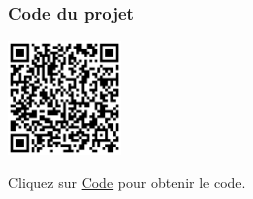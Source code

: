 \documentclass[a4paper,12pt]{report}
\begin{document}
\subsubsection{Code du projet}

\begin{minipage}{0.5\textwidth}
    \includegraphics[height=3cm]{Code TC206.png}
\end{minipage}%
\begin{minipage}{0.5\textwidth}
    Cliquez sur \href{https://github.com/DexterTaha/Controllino-PLC-Sample/blob/main/TC200/TC206_Surveillance_de_niveau_2/TC206_Surveillance_de_niveau_2.ino}{Code} pour obtenir le code.
\end{minipage}

\newpage
\end{document}
